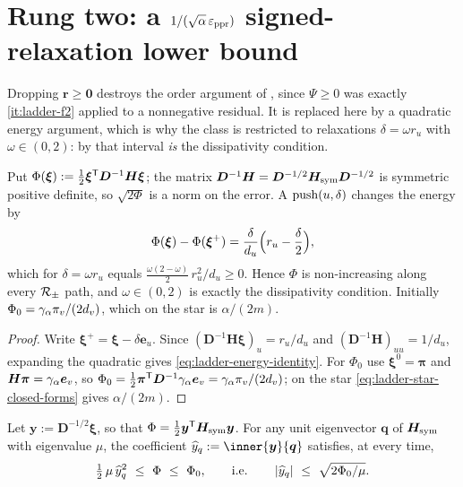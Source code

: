 \section[Rung two: signed one-hop relaxation]
{Rung two: a $1/(\sqrt\alpha\,\varepsilon_{\mathrm{ppr}})$ signed-relaxation lower bound}
\label{sec:ladder-signed-lower-bound}

Dropping $\bm{r}\ge\bm{0}$ destroys the order argument of
, since $\Psi\ge0$ was exactly
\ref{it:ladder-f2} applied to a nonnegative residual. It is replaced here by a
quadratic energy argument, which is why the class is restricted to relaxations
$\delta=\omega r_{u}$ with $\omega\in(0,2)$: by
 that interval \emph{is} the dissipativity condition.

\begin{lemma}
\label{lem:ladder-energy}
Put
$\Phi(\bm{\xi}):=\tfrac12\bm{\xi}^{\mathsf{T}}\bm{D}^{-1}\bm{H}\bm{\xi}$; the matrix
$\bm{D}^{-1}\bm{H}=\bm{D}^{-1/2}\bm{H}_{\mathrm{sym}}\bm{D}^{-1/2}$ is symmetric positive
definite, so $\sqrt{2\Phi}$ is a norm on the error. A
$\operatorname{push}(u,\delta)$ changes the energy by
\begin{equation}
    \Phi(\bm{\xi})-\Phi(\bm{\xi}^{+})
    =\frac{\delta}{d_{u}}\Bigl(r_{u}-\frac{\delta}{2}\Bigr),
    \label{eq:ladder-energy-identity}
\end{equation}
which for $\delta=\omega r_{u}$ equals
$\tfrac{\omega(2-\omega)}{2}\,r_{u}^{2}/d_{u}\ge0$. Hence $\Phi$ is
non-increasing along every $\mathcal{R}_{\pm}$ path, and $\omega\in(0,2)$ is exactly the
dissipativity condition. Initially
$\Phi_{0}=\gamma_{\alpha}\pi_{v}/(2d_{v})$, which on the star is $\alpha/(2m)$.
\end{lemma}

\begin{proof}
Write $\bm{\xi}^{+}=\bm{\xi}-\delta\bm{e}_{u}$. Since
$(\bm{D}^{-1}\bm{H}\bm{\xi})_{u}=r_{u}/d_{u}$ and
$(\bm{D}^{-1}\bm{H})_{uu}=1/d_{u}$, expanding the quadratic gives
\eqref{eq:ladder-energy-identity}. For $\Phi_{0}$ use
$\bm{\xi}^{0}=\bm{\pi}$ and $\bm{H}\bm{\pi}=\gamma_{\alpha}\bm{e}_{v}$, so
$\Phi_{0}=\tfrac12\bm{\pi}^{\mathsf{T}}\bm{D}^{-1}\gamma_{\alpha}\bm{e}_{v}
=\gamma_{\alpha}\pi_{v}/(2d_{v})$;
on the star \eqref{eq:ladder-star-closed-forms} gives $\alpha/(2m)$.
\end{proof}

\begin{lemma}
\label{lem:ladder-fast-mode}
Let $\bm{y}:=\bm{D}^{-1/2}\bm{\xi}$, so that
$\Phi=\tfrac12\bm{y}^{\mathsf{T}}\bm{H}_{\mathrm{sym}}\bm{y}$. For any unit eigenvector
$\bm{q}$ of $\bm{H}_{\mathrm{sym}}$ with eigenvalue $\mu$, the coefficient
$\widehat y_{q}:=\inner{\bm{y}}{\bm{q}}$ satisfies, at
every time,
\begin{equation}
    \tfrac12\,\mu\,\widehat y_{q}^{2}\ \le\ \Phi\ \le\ \Phi_{0},
    \qquad\text{i.e.}\qquad
    \abs{\widehat y_{q}}\ \le\ \sqrt{2\Phi_{0}/\mu}.
    \label{eq:ladder-fast-mode-cap}
\end{equation}
\end{lemma}


